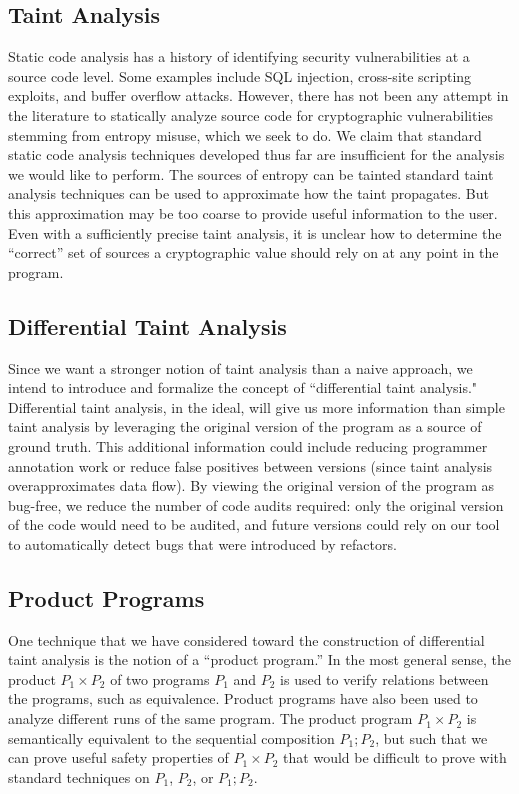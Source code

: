 \documentclass[letterpaper,twocolumn,10pt]{article}
\begin{document}
\subsection{Taint Analysis}
Static code analysis has a history of identifying security vulnerabilities at a source code level. Some examples include SQL injection, cross-site scripting exploits, and buffer overflow attacks. However, there has not been any attempt in the literature to statically analyze source code for cryptographic vulnerabilities stemming from entropy misuse, which we seek to do. We claim that standard static code analysis techniques developed thus far are insufficient for the analysis we would like to perform. 
The sources of entropy can be tainted standard taint analysis techniques can be used to approximate how the taint propagates. But this approximation may be too coarse to provide useful information to the user. Even with a sufficiently precise taint analysis, it is unclear how to determine the ``correct'' set of sources a cryptographic value should rely on at any point in the program.

\subsection{Differential Taint Analysis}

Since we want a stronger notion of taint analysis than a naive approach, we intend to introduce and formalize the concept of ``differential taint analysis." Differential
taint analysis, in the ideal, will give us more information than simple taint analysis by leveraging 
the original version of the program as a source of ground truth. This additional information could include reducing programmer annotation work or reduce false positives between versions
(since taint analysis overapproximates data flow). By viewing the original version of the program as bug-free, we reduce the number of code audits required:
only the original version of the code would need to be audited, and future versions could rely on our tool to automatically detect bugs that were introduced by refactors.

\subsection{Product Programs}

One technique that we have considered toward the construction of differential taint analysis is the notion of a ``product program.'' In the most general sense, the product $P_1 \times P_2$ of two programs $P_1$ and $P_2$ is used to verify
relations between the programs, such as equivalence. Product programs have also been used to analyze different runs of the same program. 
The product program $P_1 \times P_2$ is semantically equivalent to the sequential composition $P_1; P_2$, but such that we can prove useful safety properties of $P_1 \times P_2$ that would be difficult to prove with standard techniques on $P_1$, $P_2$, or $P_1; P_2$.
\end{document}

